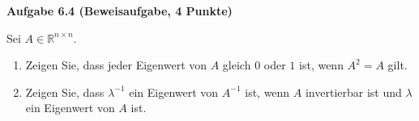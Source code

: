 \documentclass[11pt,a4paper]{article}
\newcommand{\aufgabe}[3]{\bigskip\par\textbf{Aufgabe #1 (#2, #3 Punkte)}\par\nopagebreak\smallskip}
\newcommand{\R}{\mathbb{R}}
\begin{document}
\aufgabe{6.4}{Beweisaufgabe}{4}
Sei $A \in \R^{n \times n}$.
\begin{enumerate}
  \item Zeigen Sie, dass jeder Eigenwert von $A$ gleich $0$ oder $1$ ist, wenn $A^2 = A$ gilt.
  \item Zeigen Sie, dass $\lambda^{-1}$ ein Eigenwert von $A^{-1}$ ist, wenn $A$ invertierbar ist und
        $\lambda$ ein Eigenwert von $A$ ist.
\end{enumerate}
\end{document}
